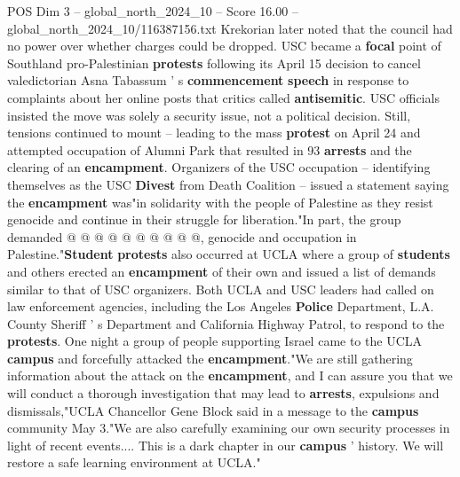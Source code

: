 \begin{textsample}{POS Dim 3 – global\_north\_2024\_10 – Score 16.00 – global\_north\_2024\_10/116387156.txt}
Krekorian later noted that the council had no power over whether charges could be dropped.
USC became a \textbf{focal} point of Southland pro-Palestinian \textbf{protests} following its April 15 decision to cancel valedictorian Asna Tabassum ' s \textbf{commencement} \textbf{speech} in response to complaints about her online posts that critics called \textbf{antisemitic}.
USC officials insisted the move was solely a security issue, not a political decision.
Still, tensions continued to mount -- leading to the mass \textbf{protest} on April 24 and attempted occupation of Alumni Park that resulted in 93 \textbf{arrests} and the clearing of an \textbf{encampment}.
Organizers of the USC occupation -- identifying themselves as the USC \textbf{Divest} from Death Coalition -- issued a statement saying the \textbf{encampment} was"in solidarity with the people of Palestine as they resist genocide and continue in their struggle for liberation."In part, the group demanded @ @ @ @ @ @ @ @ @ @, genocide and occupation in Palestine."\textbf{Student} \textbf{protests} also occurred at UCLA where a group of \textbf{students} and others erected an \textbf{encampment} of their own and issued a list of demands similar to that of USC organizers.
Both UCLA and USC leaders had called on law enforcement agencies, including the Los Angeles \textbf{Police} Department, L.A.
County Sheriff ' s Department and California Highway Patrol, to respond to the \textbf{protests}.
One night a group of people supporting Israel came to the UCLA \textbf{campus} and forcefully attacked the \textbf{encampment}."We are still gathering information about the attack on the \textbf{encampment}, and I can assure you that we will conduct a thorough investigation that may lead to \textbf{arrests}, expulsions and dismissals,"UCLA Chancellor Gene Block said in a message to the \textbf{campus} community May 3."We are also carefully examining our own security processes in light of recent events....
This is a dark chapter in our \textbf{campus} ' history.
We will restore a safe learning environment at UCLA."

\end{textsample}
